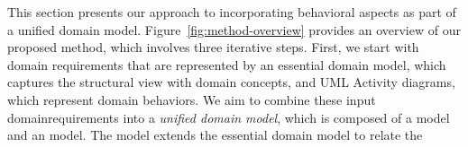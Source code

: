 {%
This section presents our approach to incorporating behavioral aspects as part of a unified domain model. Figure~\ref{fig:method-overview} provides an overview of our proposed method, which involves three iterative steps. 
%
First, we start with domain requirements that are represented by an essential domain model, which captures the structural view with domain concepts, and UML Activity diagrams, which represent domain behaviors. We aim to combine these input domain\linebreak requirements into a \textit{unified domain model}, which is composed of a \dcsl model and an \agl model. The \dcsl model extends the essential domain model to relate the%
\par}%
